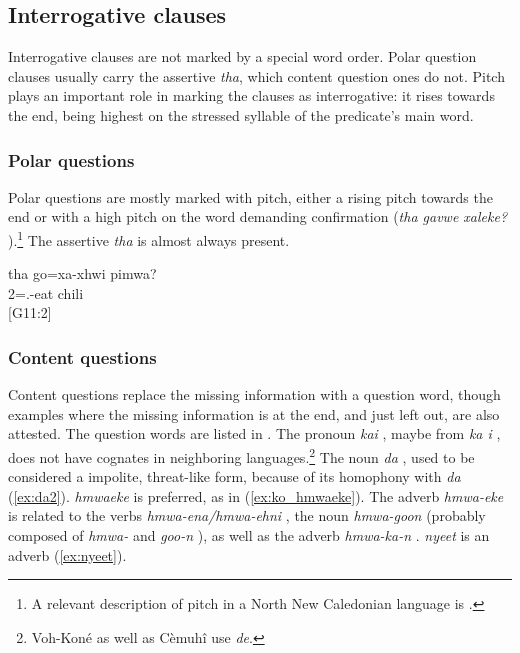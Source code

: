 \subsection{Interrogative clauses}
\label{sec:Interr_clauses}
Interrogative clauses are not marked by a special word order. Polar question clauses usually carry the assertive \textit{tha}, which content question ones do not. Pitch plays an important role in marking the clauses as interrogative: it rises towards the end, being highest on the stressed syllable of the predicate's main word.

\subsubsection{Polar questions}
\label{ssec:Polar_Q}

Polar questions are mostly marked with pitch, either a rising pitch towards the end or with a high pitch on the word demanding confirmation (\textit{tha gavwe xaleke?} ).\footnote{A relevant description of pitch in a North New Caledonian language is  .} The assertive \textit{tha} is almost always present.

\ea
\gll  tha go=xa-xhwi pimwa?\\ 
  2=.-eat chili\\ 
\glt {} {[G11:2]}
\z

\subsubsection{Content questions}
\label{ssec:Content_Q}

Content questions replace the missing information with a question word, though examples where the missing information is at the end, and just left out, are also attested. The question words are listed in . The pronoun \textit{kai} , maybe from \textit{ka i} , does not have cognates in neighboring languages.\footnote{Voh-Koné \parencite[125]{rivierre_bwatoo_2006} as well as Cèmuhî \parencite[215]{rivierre_langue_1980} use \textit{de}.} The noun \textit{da} , used to be considered a impolite, threat-like form, because of its homophony with \textit{da}  (\ref{ex:da2}). \textit{hmwaeke}  is preferred, as in (\ref{ex:ko_hmwaeke}). The adverb \textit{hmwa-eke}  is related to the verbs \textit{hmwa-ena/hmwa-ehni} , the noun \textit{hmwa-goon}  (probably composed of \textit{hmwa-} and \textit{goo-n} ), as well as the adverb \textit{hmwa-ka-n} . \textit{nyeet}  is an adverb (\ref{ex:nyeet}). 

